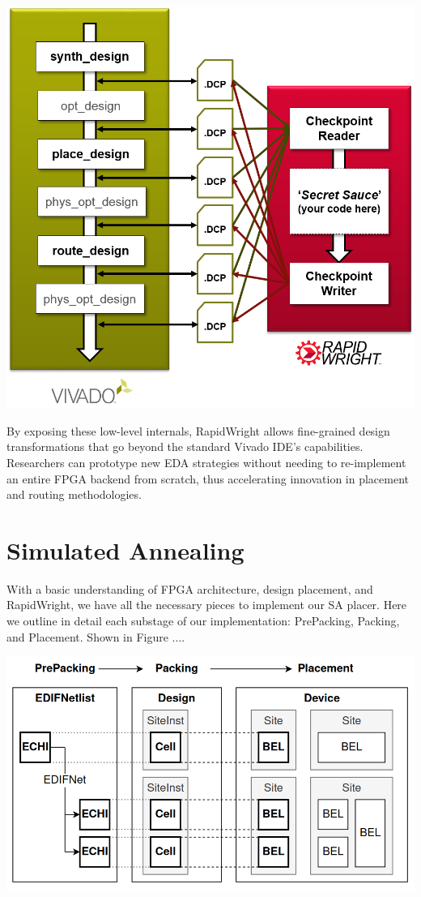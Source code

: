 \documentclass{article}
\begin{document}
\begin{multicols}{2}
    {
        \centering
        \includegraphics[width=0.8\columnwidth]{figures/vivado_dcps.png}
        \label{fig:vivado_dcps}
    }

    By exposing these low-level internals, RapidWright allows fine-grained design transformations that go beyond the standard Vivado IDE’s capabilities. 
    Researchers can prototype new EDA strategies without needing to re-implement an entire FPGA backend from scratch, thus accelerating innovation in placement and routing methodologies.

\section{Simulated Annealing}
    \label{sec:simulated_annealing}
    With a basic understanding of FPGA architecture, design placement, and RapidWright, we have all the necessary pieces to implement our SA placer. 
    Here we outline in detail each substage of our implementation: PrePacking, Packing, and Placement. 
    Shown in Figure ....

    {
        \centering
        \includegraphics[width=0.9\columnwidth]{figures/edif_design_device.png}
        \label{fig:edif_design_device}
    }

    \end{multicols}
\end{document}

